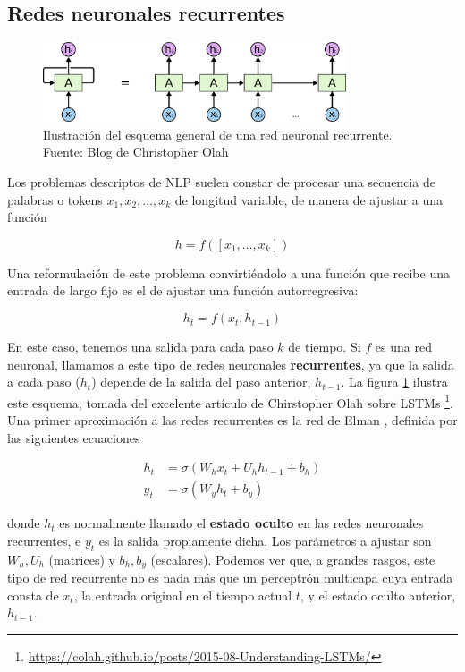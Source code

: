 \subsection{Redes neuronales recurrentes}

\begin{figure}
    \centering
    \includegraphics[width=0.8\textwidth]{img/rnn.png}
    \caption{Ilustración del esquema general de una red neuronal recurrente. Fuente: Blog de Christopher Olah}
    \label{fig:recurrent_net}
\end{figure}

Los problemas descriptos de NLP suelen constar de procesar una secuencia de palabras o tokens $x_1, x_2, \ldots, x_k$ de longitud variable, de manera de ajustar a una función

\begin{equation*}
    h = f([x_1, \ldots, x_k])
\end{equation*}

Una reformulación de este problema convirtiéndolo a una función que recibe una entrada de largo fijo es el de ajustar una función autorregresiva:

\begin{equation*}
    h_t = f(x_t, h_{t-1})
\end{equation*}

\noindent En este caso, tenemos una salida para cada paso $k$ de tiempo. Si $f$ es una red neuronal, llamamos a este tipo de redes neuronales \textbf{recurrentes}, ya que la salida a cada paso ($h_t$) depende de la salida del paso anterior, $h_{t-1}$. La figura \ref{fig:recurrent_net}  ilustra este esquema, tomada del excelente artículo de Chirstopher Olah sobre LSTMs \footnote{\url{https://colah.github.io/posts/2015-08-Understanding-LSTMs/}}. Una primer aproximación a las redes recurrentes es la red de Elman \cite{elman1990finding}, definida por las siguientes ecuaciones

\begin{align}
h_t &= \sigma(W_h x_t + U_h h_{t-1} + b_h) \\
y_t &= \sigma(W_y h_t + b_y)
\label{eq:elman}
\end{align}

\noindent donde $h_t$ es normalmente llamado el \textbf{estado oculto} en las redes neuronales recurrentes, e $y_t$ es la salida propiamente dicha. Los parámetros a ajustar son $W_h, U_h$ (matrices) y $b_h, b_y$ (escalares). Podemos ver que, a grandes rasgos, este tipo de red recurrente no es nada más que un perceptrón multicapa cuya entrada consta de $x_t$, la entrada original en el tiempo actual $t$, y el estado oculto anterior, $h_{t-1}$.

